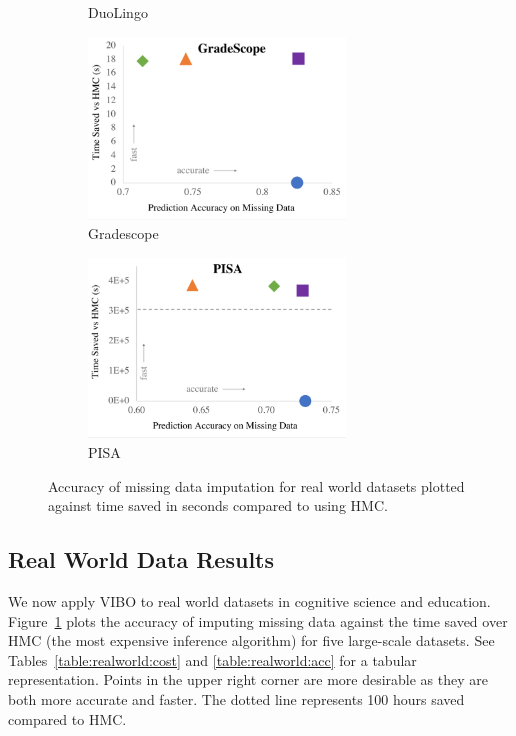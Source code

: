 \begin{figure}
\begin{subfigure}[b]{0.5\textwidth}
        \caption{DuoLingo}
    \end{subfigure}
    \begin{subfigure}[b]{0.5\textwidth}
        \centering
        \includegraphics[width=0.75\textwidth]{images/chapter7/excel/gradescope.png}
        \caption{Gradescope}
    \end{subfigure}
    \begin{subfigure}[b]{0.5\textwidth}
        \centering
        \includegraphics[width=0.75\textwidth]{images/chapter7/excel/pisa.png}
        \caption{PISA}
    \end{subfigure}
    \caption{Accuracy of missing data imputation for real world datasets plotted against time saved in seconds compared to using HMC.}
    \label{fig:realworld}
\end{figure}

\subsection{Real World Data Results}
We now apply VIBO to real world datasets in cognitive science and education.
Figure~\ref{fig:realworld} plots the  accuracy of imputing missing data against the time saved over HMC (the most expensive inference algorithm) for five  large-scale datasets.  
See Tables~\ref{table:realworld:cost} and \ref{table:realworld:acc} for a tabular representation.
Points in the upper right corner are more desirable as they are both more accurate and faster.
The dotted line represents 100 hours saved compared to HMC.

